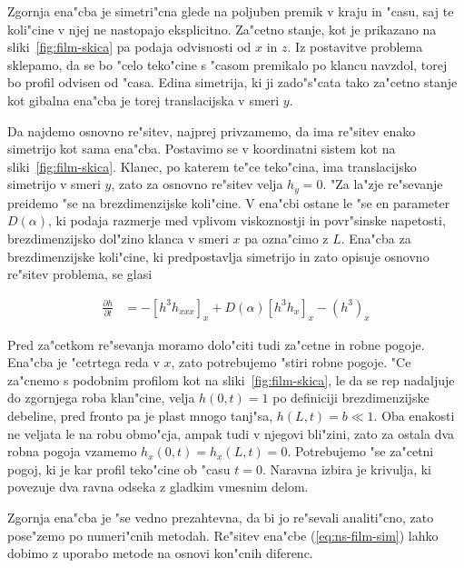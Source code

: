 \documentclass[a4paper,10pt]{article}
\newcommand{\odv}[1]{\frac{\partial #1}{\partial t}}
\begin{document}
Zgornja ena"cba je simetri"cna glede na poljuben premik v kraju in "casu, saj te koli"cine v njej ne nastopajo eksplicitno. Za"cetno stanje, kot je prikazano na sliki~\ref{fig:film-skica} pa podaja odvisnosti od $x$ in $z$. Iz postavitve problema sklepamo, da se bo "celo teko"cine s "casom premikalo po klancu navzdol, torej bo profil odvisen od "casa. Edina simetrija, ki ji zado"s"cata tako za"cetno stanje kot gibalna ena"cba je torej translacijska v smeri $y$. 

Da najdemo osnovno re"sitev, najprej privzamemo, da ima re"sitev enako simetrijo kot sama ena"cba. Postavimo se v koordinatni sistem kot na sliki~\ref{fig:film-skica}. Klanec, po katerem te"ce teko"cina, ima translacijsko simetrijo v smeri $y$, zato za osnovno re"sitev velja $h_y = 0$. "Za la"zje re"sevanje preidemo "se na brezdimenzijske koli"cine. V ena"cbi ostane le "se en parameter $D(\alpha)$, ki podaja razmerje med vplivom viskoznostji in povr"sinske napetosti, brezdimenzijsko dol"zino klanca v smeri $x$ pa ozna"cimo z $L$. Ena"cba za brezdimenzijske koli"cine, ki predpostavlja simetrijo in zato opisuje osnovno re"sitev problema, se glasi

\begin{align}
  \label{eq:ns-film-sim}
 \odv{h} &= - \left[h^3 h_{xxx}\right]_x + D(\alpha) \left[h^3 h_x\right]_x - \left(h^3\right)_x
\end{align}

Pred za"cetkom re"sevanja moramo dolo"citi tudi za"cetne in robne pogoje. Ena"cba je "cetrtega reda v $x$, zato potrebujemo "stiri robne pogoje. "Ce za"cnemo s podobnim profilom kot na sliki~\ref{fig:film-skica}, le da se rep nadaljuje do zgornjega roba klan"cine, velja $h(0, t) = 1$ po definiciji brezdimenzijske debeline, pred fronto pa je plast mnogo tanj"sa, $h(L, t) = b \ll 1$. Oba enakosti ne veljata le na robu obmo"cja, ampak tudi v njegovi bli"zini, zato za ostala dva robna pogoja vzamemo $h_x(0,t) = h_x(L,t) = 0$. Potrebujemo "se za"cetni pogoj, ki je kar profil teko"cine ob "casu $t=0$. Naravna izbira je krivulja, ki povezuje dva ravna odseka z gladkim vmesnim delom. 

Zgornja ena"cba je "se vedno prezahtevna, da bi jo re"sevali analiti"cno, zato pose"zemo po numeri"cnih metodah. Re"sitev ena"cbe (\ref{eq:ns-film-sim}) lahko dobimo z uporabo metode na osnovi kon"cnih diferenc. 
\end{document}
